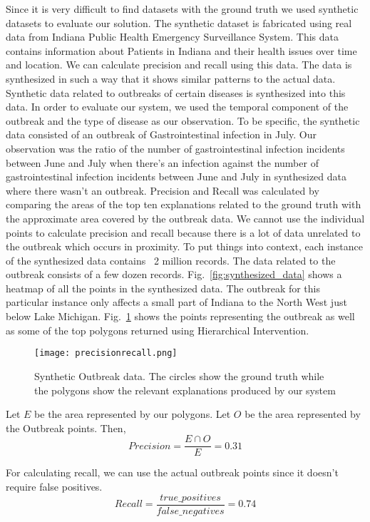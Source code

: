 Since it is very difficult to find datasets with the ground truth we used synthetic datasets to evaluate our solution\citep{maciejewski2009generating}. The synthetic dataset is fabricated using real data from Indiana Public Health Emergency Surveillance System. This data contains information about Patients in Indiana and their health issues over time and location. We can calculate precision and recall using this data\citep{powers2011evaluation}. The data is synthesized in such a way that it shows similar patterns to the actual data. Synthetic data related to outbreaks of certain diseases is synthesized into this data. In order to evaluate our system, we used the temporal component of the outbreak and the type of disease as our observation. To be specific, the synthetic data consisted of an outbreak of Gastrointestinal infection in July. Our observation was the ratio of the number of gastrointestinal infection incidents between June and July when there's an infection against the number of gastrointestinal infection incidents between June and July in synthesized data where there wasn't an outbreak. Precision and Recall was calculated by comparing the areas of the top ten explanations related to the ground truth with the approximate area covered by the outbreak data. We cannot use the individual points to calculate precision and recall because there is a lot of data unrelated to the outbreak which occurs in proximity. To put things into context, each instance of the synthesized data contains ~2 million records. The data related to the outbreak consists of a few dozen records. Fig.~\ref{fig:synthesized_data} shows a heatmap of all the points in the synthesized data. The outbreak for this particular instance only affects a small part of Indiana to the North West just below Lake Michigan. Fig.~\ref{fig:precisionrecall} shows the points representing the outbreak as well as some of the top polygons returned using Hierarchical Intervention.

\begin{figure}[h]
\texttt{[image: precisionrecall.png]}
\caption{Synthetic Outbreak data. The circles show the ground truth while the polygons show the relevant explanations produced by our system}
\label{fig:precisionrecall}
\end{figure}

Let $E$ be the area represented by our polygons. Let $O$ be the area represented by the Outbreak points. Then,
$$Precision = \frac{E \cap O}{E} = 0.31$$

For calculating recall, we can use the actual outbreak points since it doesn't require false positives.
$$Recall = \frac{true\_positives}{false\_negatives} = 0.74$$




